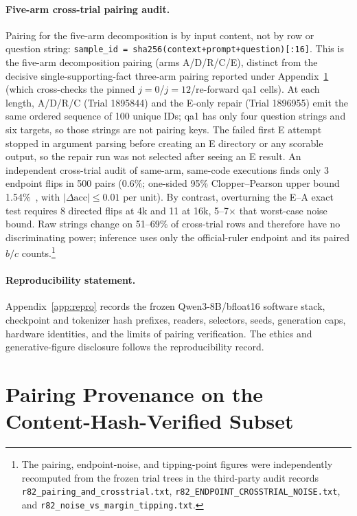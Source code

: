 \paragraph{Five-arm cross-trial pairing audit.}
Pairing for the five-arm decomposition is by input content, not by row or
question string: \texttt{sample\_id = sha256(context+prompt+question)[:16]}.
This is the five-arm decomposition pairing (arms A/D/R/C/E), distinct from the
decisive single-supporting-fact three-arm pairing reported under
Appendix~\ref{app:pairing-provenance} (which cross-checks the pinned
$j{=}0$/$j{=}12$/re-forward qa1 cells).  At each
length, A/D/R/C (Trial 1895844) and the E-only repair (Trial 1896955) emit the
same ordered sequence of 100 unique IDs; qa1 has only four question strings
and six targets, so those strings are not pairing keys.  The failed first E
attempt stopped in argument parsing before creating an E directory or any
scorable output, so the repair run was not selected after seeing an E result.
An independent cross-trial audit of same-arm, same-code executions finds only
3 endpoint flips in 500 pairs (0.6\%; one-sided 95\% Clopper--Pearson upper
bound 1.54\%~\citep{clopper1934}, with $|\Delta\mathrm{acc}|\leq0.01$ per
unit).  By contrast, overturning the E--A exact test requires 8 directed flips
at 4k and 11 at 16k, 5--7$\times$ that worst-case noise bound.  Raw strings
change on 51--69\% of cross-trial rows and therefore have no discriminating
power; inference uses only the official-ruler endpoint and its paired $b/c$
counts.\footnote{The pairing, endpoint-noise, and tipping-point figures were
independently recomputed from the frozen trial trees in the third-party audit
records \texttt{r82\_pairing\_and\_crosstrial.txt},
\texttt{r82\_ENDPOINT\_CROSSTRIAL\_NOISE.txt}, and
\texttt{r82\_noise\_vs\_margin\_tipping.txt}.}

\paragraph{Reproducibility statement.}
Appendix~\ref{app:repro} records the frozen Qwen3-8B/bfloat16 software stack,
checkpoint and tokenizer hash prefixes, readers, selectors, seeds, generation
caps, hardware identities, and the limits of pairing verification.  The ethics
and generative-figure disclosure follows the reproducibility record.

\FloatBarrier

\section{Pairing Provenance on the Content-Hash-Verified Subset}
\label{app:pairing-provenance}

